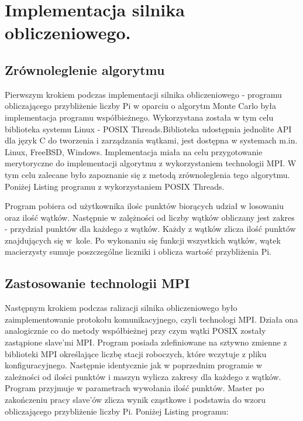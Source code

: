 \documentclass[a4paper,12pt]{article}		%
\begin{document}
\section{Implementacja silnika obliczeniowego.}

\subsection{Zrównoleglenie algorytmu}
Pierwszym krokiem podczas implementacji silnika obliczeniowego - programu obliczającego przybliżenie liczby Pi w oparciu o algorytm Monte Carlo była implementacja programu współbieżnego. Wykorzystana została w tym celu biblioteka systemu Linux - POSIX Threads.Biblioteka udostępnia jednolite API dla język C do tworzenia i zarządzania wątkami, jest dostępna w systemach m.in. Linux, FreeBSD, Windows. Implementacja miała na celu przygotowanie merytoryczne do implementacji algorytmu z wykorzystaniem technologii MPI. W tym celu zalecane było zapoznanie się z metodą zrównoleglenia tego algorytmu. Poniżej Listing programu z wykorzystaniem POSIX Threads.



Program pobiera od użytkownika ilośc punktów biorących udział w losowaniu oraz ilość wątków. Następnie w zalężności od liczby wątków obliczany jest zakres - przydział punktów dla każdego z wątków. Każdy z wątków zlicza ilość punktów znajdujących się w~kole. Po wykonaniu się funkcji wszystkich wątków, wątek macierzysty sumuje poszczególne liczniki i oblicza wartość przybliżenia Pi. 

\subsection{Zastosowanie technologii MPI}
Następnym krokiem podczas ralizacji silnika obliczeniowego było zaimplementowanie protokołu komunikacyjnego, czyli technologi MPI. Działa ona analogicznie co do metody współbieżnej przy czym wątki POSIX zostały zastąpione slave'mi MPI. Program posiada zdefiniowane na sztywno zmienne z biblioteki MPI określające liczbę stacji roboczych, które wczytuje z pliku konfiguracyjnego. Następnie identycznie jak w poprzednim programie w zależności od ilości punktów i maszyn wylicza zakresy dla każdego z wątków. Program przyjmuje w parametrach wywołania ilość punktów. Master po zakończeniu pracy slave'ów zlicza wynik cząstkowe i podstawia do wzoru obliczającego przybliżenie liczby Pi. Poniżej Listing programu: 
\end{document}
